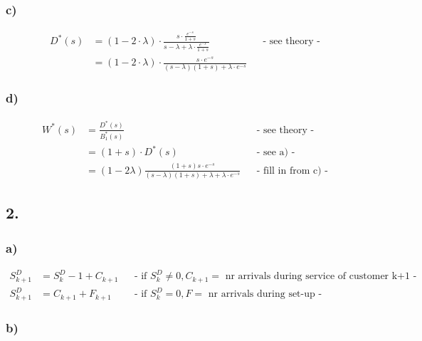 \subsubsection*{ c) }
\begin{align*}
D^{{\ast }}\left(s\right)&=\left(1-2\cdot \lambda \right)\cdot \frac{s\cdot \frac{e^{{-s}}}{1+s}}{s-\lambda +\lambda \cdot \frac{e^{{-s}}}{1+s}} && \text{- see theory -}\\
&=\left(1-2\cdot \lambda \right)\cdot \frac{s\cdot e^{{-s}}}{\left(s-\lambda \right)\left(1+s\right)+\lambda \cdot e^{{-s}}}
\end{align*}
\subsubsection*{ d) }
\begin{align*}
W^{{\ast }}\left(s\right)&=\frac{D^{{\ast }}\left(s\right)}{B_{1}^{{\ast }}\left(s\right)} && \text{- see theory -}\\
&=\left(1+s\right)\cdot D^{{\ast }}\left(s\right) && \text{- see a) -}\\
&=\left(1-2\lambda \right)\frac{\left(1+s\right)s\cdot e^{{-s}}}{\left(s-\lambda \right)\left(1+s\right)+\lambda +\lambda \cdot e^{{-s}}} && \text{- fill in from c) -}
\end{align*}

\subsection*{ 2. }

\subsubsection*{ a) }

\begin{align*}
S_{{k+1}}^{D}&=S_{k}^{D}-1+C_{{k+1}}&& \text{-  if $S_{k}^{D} \neq 0,C_{{k+1}}=$ nr arrivals during service of customer k+1 -}\\
S_{{k+1}}^{D}&=C_{{k+1}}+F_{{k+1}}&& \text{-  if $S_{k}^{D}=0,F=$ nr arrivals during set-up -}
\end{align*}

\subsubsection*{ b) }

